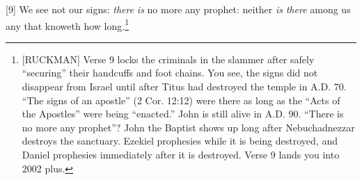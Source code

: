 [9] \textcolor[rgb]{0.00,0.00,1.00}{We see not our signs: \emph{there} \emph{is} no more any prophet: neither \emph{is} \emph{there} among us any that knoweth how long.}\footnote{[RUCKMAN] Verse 9 locks the criminals in the slammer after safely “securing” their handcuffs and foot chains. You see, the signs did not disappear from Israel until after Titus had destroyed the temple in A.D. 70. “The signs of an apostle” (2 Cor. 12:12) were there as long as the “Acts of the Apostles” were being “enacted.” John is still alive in A.D. 90. “There is no more any prophet”? John the Baptist shows up long after Nebuchadnezzar destroys the sanctuary. Ezekiel prophesies while it is being destroyed, and Daniel prophesies immediately after it is destroyed. Verse 9 lands you into 2002 plus.\cite{Ruckman1992Psalms}}
